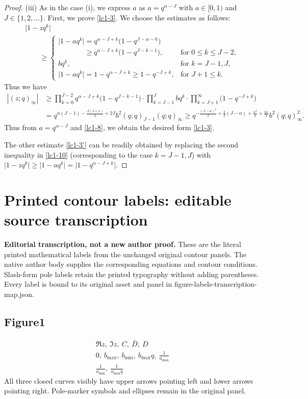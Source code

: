 \documentclass[11pt]{article}
\numberwithin{equation}{section}
\numberwithin{equation}{section}
\def\a{\alpha}
\def\i{\infty}
\begin{document}
\begin{proof}
 (iii)
 As in the case (i),
 we express $a$ as $a=q^{\a-J}$ with $a\in[0,1)$ and $J\in\{1,2,\dots\}$.
 First, we prove \eqref{lc1-3}.
 We choose the estimates as follows:
 \begin{gather}
 \big|1-z q^k\big|\nonumber
 \\
 \qquad\ge
 \begin{cases}
 \big|1-a q^k\big|=q^{\a-J+k}\big(1-q^{J-\a-k}\big)&\\
 \phantom{ \big|1-a q^k\big|}{} \ge q^{\a-J+k}\big(1-q^{J-k-1}\big), & {\text{for $0\le k\le J-2$}},
 \\
 bq^k, & {\text{for $k=J-1,J$}},
 \\
 \big|1-a q^k\big|=1-q^{\a-J+k}\ge 1-q^{-J+k}, & {\text{for $J+1\le k$}}.
 \end{cases}\label{lc1-10}
 \end{gather}
 Thus we have
 \begin{align*}%
 |(z;q)_{\i}|
 &\ge
 \prod_{k=0}^{J-2} q^{\a-J+k}\big(1-q^{J-k-1}\big)
 \cdot
 \prod_{k=J-1}^{J} bq^{k}
 \cdot
 \prod_{k=J+1}^{\i} \big(1-q^{-J+k}\big)
 \\
 &=
 q^{\a(J-1)-\frac{J(J+1)}{2}+2J}b^2(q;q)_{J-1}(q;q)_{\infty}\ge
 q^{-\frac{(J-\alpha)^2}{2}+\frac32(J-\alpha)+\frac{\alpha^2}{4}+\frac{3\alpha}{2}}b^2(q;q)_{\infty}^2.
 \end{align*}
 Thus from $a=q^{\alpha-J}$ and \eqref{lc1-8}, we
 obtain the desired form \eqref{lc1-3}.

 The other estimate \eqref{lc1-3'}
 can be readily
 obtained by replacing the second inequality in \eqref{lc1-10}
 (corresponding to the case $k=J-1, J$)
 with $\big|1-zq^k\big|\ge \big|1-aq^k\big|=\big|1-q^{\a-J+k}\big|$.
\end{proof}

\section*{Printed contour labels: editable source transcription}
\noindent\textbf{Editorial transcription, not a new author proof.} These are the literal printed mathematical labels from the unchanged original contour panels. The native author body supplies the corresponding equations and contour conditions. Slash-form pole labels retain the printed typography without adding parentheses. Every label is bound to its original asset and panel in figure-labels-transcription-map.json.
\subsection*{Figure1}
\[\begin{gathered}\Re z,\ \Im z,\ C,\ \bar D,\ D\\
0,\ b_{\max},\ b_{\min},\ b_{\max}q,\ \frac1{a_{\max}}\\
\frac1{a_{\min}},\ \frac1{a_{\max}q}\end{gathered}\]
\noindent All three closed curves visibly have upper arrows pointing left and lower arrows pointing right. Pole-marker symbols and ellipses remain in the original panel.\par
\end{document}
